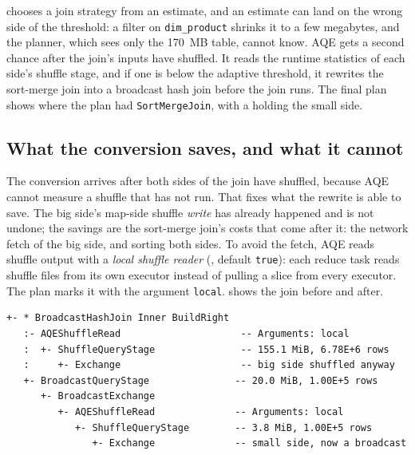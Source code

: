  chooses a join strategy from an estimate, and an
estimate can land on the wrong side of the threshold: a filter on
\texttt{dim\_product} shrinks it to a few megabytes, and the planner, which sees
only the 170~MB table, cannot know. AQE gets a second chance after the join's
inputs have shuffled. It reads the runtime
statistics of each side's shuffle stage, and if one is below the adaptive
threshold, it rewrites the sort-merge join into a broadcast hash join before the
join runs. The final plan shows  where the plan had
\texttt{SortMergeJoin}, with a  holding the small
side.

\subsection{What the conversion saves, and what it cannot}

The conversion arrives after both sides of the join have shuffled, because AQE
cannot measure a shuffle that has not run. That fixes what the rewrite is able
to save. The big side's map-side shuffle \emph{write} has already happened and is
not undone; the savings are the sort-merge join's costs that come after it: the
network fetch of the big side, and sorting both sides. To avoid the fetch, AQE
reads shuffle output with a \emph{local shuffle reader}
(, default \texttt{true}):
each reduce task reads shuffle files from its own executor instead of pulling a
slice from every executor. The plan marks it with the argument \texttt{local}.  shows the join
before and after.

\begin{lstlisting}[language=text,numbers=none,style=plan,caption={A runtime broadcast promotion in a final plan (\texttt{EXPLAIN FORMATTED}, trimmed)},captionpos=b,label=lst:aqe-broadcast-plan]
+- * BroadcastHashJoin Inner BuildRight
   :- AQEShuffleRead                     -- Arguments: local
   :  +- ShuffleQueryStage               -- 155.1 MiB, 6.78E+6 rows
   :     +- Exchange                     -- big side shuffled anyway
   +- BroadcastQueryStage               -- 20.0 MiB, 1.00E+5 rows
      +- BroadcastExchange
         +- AQEShuffleRead              -- Arguments: local
            +- ShuffleQueryStage        -- 3.8 MiB, 1.00E+5 rows
               +- Exchange              -- small side, now a broadcast
\end{lstlisting}

